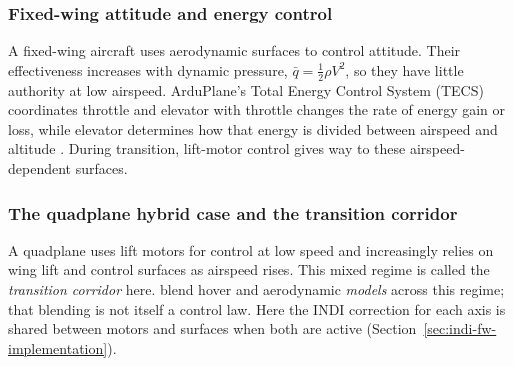 \documentclass{article}
\begin{document}
\subsubsection{Fixed-wing attitude and energy control}
\label{sec:tecs}
A fixed-wing aircraft uses aerodynamic surfaces to control attitude. Their effectiveness increases with dynamic pressure, $\bar{q}=\tfrac{1}{2}\rho V^{2}$, so they have little authority at low airspeed. ArduPlane's Total Energy Control System (TECS) coordinates throttle and elevator with throttle changes the rate of energy gain or loss, while elevator determines how that energy is divided between airspeed and altitude \citep{lambregts1983tecs,ardupilotdocs}. During transition, lift-motor control gives way to these airspeed-dependent surfaces.

\subsubsection{The quadplane hybrid case and the transition corridor}
\label{sec:transition-corridor}
A quadplane uses lift motors for control at low speed and increasingly relies on wing lift and control surfaces as airspeed rises. This mixed regime is called the \emph{transition corridor} here. \citet{lombaerts2019} blend hover and aerodynamic \emph{models} across this regime; that blending is not itself a control law. Here the INDI correction for each axis is shared between motors and surfaces when both are active (Section~\ref{sec:indi-fw-implementation}).
\end{document}
